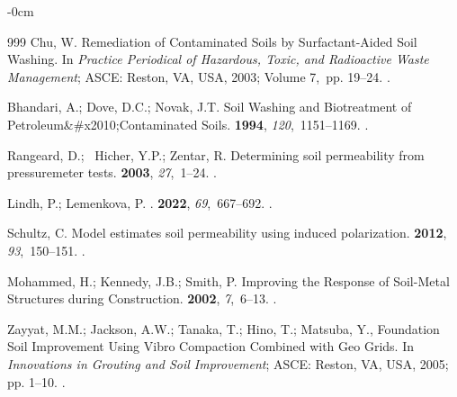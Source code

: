 \documentclass[algorithms,article,accept,pdftex,moreauthors]{Definitions/mdpi}
\begin{document}
\begin{adjustwidth}{-\extralength}{0cm}
\begin{thebibliography}{999}
Chu, W.
\newblock Remediation of Contaminated Soils by Surfactant-Aided Soil Washing.
\newblock In {\em Practice Periodical of Hazardous, Toxic, and
Radioactive Waste Management}; ASCE: Reston, VA, USA, %
2003; {Volume 7},~pp. 19--24.
.

Bhandari, A.; Dove, D.C.; Novak, J.T.
\newblock Soil Washing and Biotreatment of Petroleum\&\#x2010;Contaminated
  Soils.
 {\bf 1994}, {\em
  120},~1151--1169.
.

Rangeard, D.; ~Hicher, Y.P.; Zentar, R.
\newblock Determining soil permeability from pressuremeter tests.
 {\bf 2003}, {\em 27},~1--24.
.

Lindh, P.; Lemenkova, P.
.
 {\bf 2022}, {\em
  69},~667--692.
.

Schultz, C.
\newblock Model estimates soil permeability using induced polarization.
 {\bf 2012}, {\em
  93},~150--151.
.

Mohammed, H.; Kennedy, J.B.; Smith, P.
\newblock Improving the Response of Soil-Metal Structures during Construction.
 {\bf 2002}, {\em 7},~6--13.
.

Zayyat, M.M.; Jackson, A.W.; Tanaka, T.; Hino, T.; Matsuba, Y., Foundation Soil
  Improvement Using Vibro Compaction Combined with Geo Grids.
\newblock In {\em Innovations in Grouting and Soil Improvement}; ASCE: Reston, VA, USA, %
  2005;
  pp. 1--10.
.


\end{thebibliography}
\end{adjustwidth}
\end{document}
